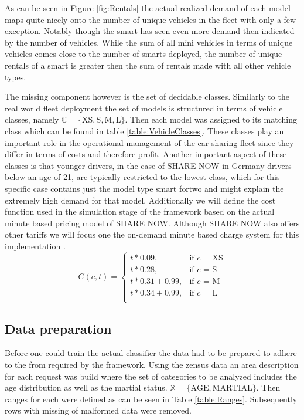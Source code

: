 As can be seen in Figure \ref{fig:Rentals} the actual realized demand of each model maps quite nicely
onto the number of unique vehicles in the fleet with only a few exception. Notably though the smart has
seen even more demand then indicated by the number of vehicles. While the sum of all mini vehicles in terms
of unique vehicles comes close to the number of smarts deployed, the number of unique rentals of a smart
is greater then the sum of rentals made with all other vehicle types.

The missing component however is the set of decidable classes. Similarly to the real world fleet deployment the
set of models is structured in terms of vehicle classes, namely $\mathbb{C} = \{ \text{XS}, \text{S}, \text{M}, \text{L} \}$.
Then each model was assigned to its matching class which can be found in table \ref{table:VehicleClasses}.
These classes play an important role in the operational management of the car-sharing fleet since they differ in terms of costs and therefore profit.
Another important aspect of these classes is that younger drivers, in the case of SHARE NOW in Germany drivers below an age of 21, are typically
restricted to the lowest class, which for this specific case contains just the model type smart fortwo and might explain
the extremely high demand for that model. Additionally we will define the cost function used in the simulation stage
of the framework based on the actual minute based pricing model of SHARE NOW. Although SHARE NOW also offers other tariffs we will focus one
the on-demand minute based charge system for this implementation \cite{ShareNowPricing}.
$$
C(c, t) = \begin{cases}
  t * 0.09, & \text{if $c$ = XS}\\
  t * 0.28, & \text{if $c$ = S}\\
  t * 0.31 + 0.99, & \text{if $c$ = M}\\
  t * 0.34 + 0.99, & \text{if $c$ = L}\\
 \end{cases}
$$

\subsection{Data preparation}
\label{sub_sec:CaseStudy/Preparation}

Before one could train the actual classifier the data had to be prepared to adhere to the from
required by the framework. Using the zensus data an area description for each request was
build where the set of categories to be analyzed includes the age distribution as well as the martial status.
$\mathbb{X} = \{ \text{AGE}, \text{MARTIAL} \}$. Then ranges for each were defined as can be seen in Table \ref{table:Ranges}.
Subsequently rows with missing of malformed data were removed.

